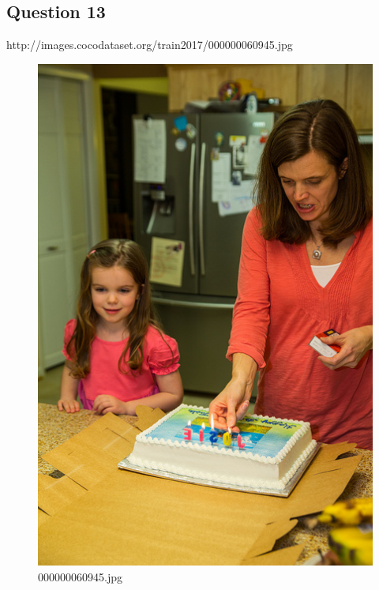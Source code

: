 \subsection*{Question 13}
http://images.cocodataset.org/train2017/000000060945.jpg
    \begin{figure}[h]
        \centering
        \includegraphics[width=0.8\linewidth]{../image set/easy/000000060945.jpg}
        \caption{000000060945.jpg}
    \end{figure}
